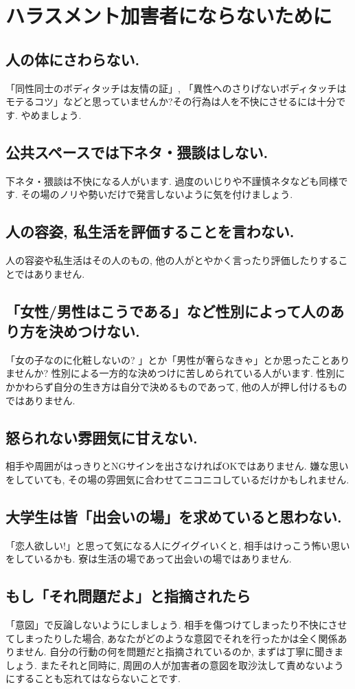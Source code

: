 \section{ハラスメント加害者にならないために}
\label{sec:harassment}

  \subsection{人の体にさわらない. }
  「同性同士のボディタッチは友情の証」, 「異性へのさりげないボディタッチはモテるコツ」などと思っていませんか?その行為は人を不快にさせるには十分です. やめましょう.
  
  \subsection{公共スペースでは下ネタ・猥談はしない. }
  下ネタ・猥談は不快になる人がいます. 過度のいじりや不謹慎ネタなども同様です. その場のノリや勢いだけで発言しないように気を付けましょう. 
  
  \subsection{人の容姿, 私生活を評価することを言わない. }
  人の容姿や私生活はその人のもの, 他の人がとやかく言ったり評価したりすることではありません. 
  
  \subsection{「女性/男性はこうである」など性別によって人のあり方を決めつけない.}
  「女の子なのに化粧しないの? 」とか「男性が奢らなきゃ」とか思ったことありませんか? 性別による一方的な決めつけに苦しめられている人がいます. 性別にかかわらず自分の生き方は自分で決めるものであって, 他の人が押し付けるものではありません. 
  
  \subsection{怒られない雰囲気に甘えない. }
  相手や周囲がはっきりとNGサインを出さなければOKではありません. 嫌な思いをしていても, その場の雰囲気に合わせてニコニコしているだけかもしれません. 
  
  \subsection{大学生は皆「出会いの場」を求めていると思わない. }
  「恋人欲しい!」と思って気になる人にグイグイいくと, 相手はけっこう怖い思いをしているかも. 寮は生活の場であって出会いの場ではありません.
  
  \subsection{もし「それ問題だよ」と指摘されたら}
  「意図」で反論しないようにしましょう. 相手を傷つけてしまったり不快にさせてしまったりした場合, あなたがどのような意図でそれを行ったかは全く関係ありません. 自分の行動の何を問題だと指摘されているのか, まずは丁寧に聞きましょう. またそれと同時に, 周囲の人が加害者の意図を取沙汰して責めないようにすることも忘れてはならないことです. 

  
